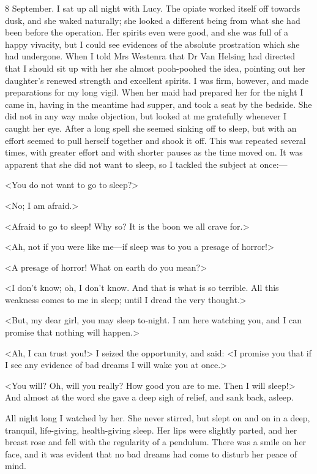 \begin{diary}{8 September.}
I sat up all night with Lucy. The opiate worked itself off towards dusk, and she waked naturally; she looked a different being from what she had been before the operation. Her spirits even were good, and she was full of a happy vivacity, but I could see evidences of the absolute prostration which she had undergone. When I told Mrs Westenra that Dr Van Helsing had directed that I should sit up with her she almost pooh-poohed the idea, pointing out her daughter's renewed strength and excellent spirits. I was firm, however, and made preparations for my long vigil. When her maid had prepared her for the night I came in, having in the meantime had supper, and took a seat by the bedside. She did not in any way make objection, but looked at me gratefully whenever I caught her eye. After a long spell she seemed sinking off to sleep, but with an effort seemed to pull herself together and shook it off. This was repeated several times, with greater effort and with shorter pauses as the time moved on. It was apparent that she did not want to sleep, so I tackled the subject at once:—

<You do not want to go to sleep?>

<No; I am afraid.>

<Afraid to go to sleep! Why so? It is the boon we all crave for.>

<Ah, not if you were like me—if sleep was to you a presage of horror!>

<A presage of horror! What on earth do you mean?>

<I don't know; oh, I don't know. And that is what is so terrible. All this weakness comes to me in sleep; until I dread the very thought.>

<But, my dear girl, you may sleep to-night. I am here watching you, and I can promise that nothing will happen.>

<Ah, I can trust you!> I seized the opportunity, and said: <I promise you that if I see any evidence of bad dreams I will wake you at once.>

<You will? Oh, will you really? How good you are to me. Then I will sleep!> And almost at the word she gave a deep sigh of relief, and sank back, asleep.

All night long I watched by her. She never stirred, but slept on and on in a deep, tranquil, life-giving, health-giving sleep. Her lips were slightly parted, and her breast rose and fell with the regularity of a pendulum. There was a smile on her face, and it was evident that no bad dreams had come to disturb her peace of mind.


\end{diary}
